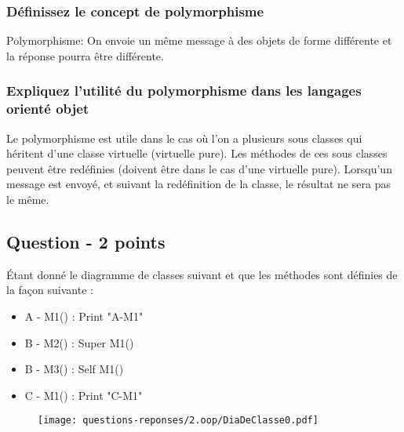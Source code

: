 \subsubsection{Définissez le concept de polymorphisme}
\textcolor[rgb]{0,0.48,0.58}{Polymorphisme: On envoie un même message à des objets de forme différente et la réponse pourra être différente.}



\subsubsection{Expliquez l'utilité du polymorphisme dans les langages orienté objet}
\textcolor[rgb]{0,0.48,0.58}{Le polymorphisme est utile dans le cas où l'on a plusieurs sous classes qui héritent d'une classe virtuelle (virtuelle pure). Les méthodes de ces sous classes peuvent être redéfinies (doivent être dans le cas d'une virtuelle pure). Lorsqu'un message est envoyé, et suivant la redéfinition de la classe, le résultat ne sera pas le même.}



\subsection{Question - 2 points}
Étant donné le diagramme de classes suivant et que les méthodes sont définies de la façon suivante :
\begin{itemize}
	\item A - M1() : Print "A-M1"
	\item B - M2() : Super M1()
    \item B - M3() : Self M1()
	\item C - M1() : Print "C-M1"
\end{itemize}
\begin{figure}[h]
	\centering
		\texttt{[image: questions-reponses/2.oop/DiaDeClasse0.pdf]}
	\label{fig:DiaDeClasse0}
\end{figure}



